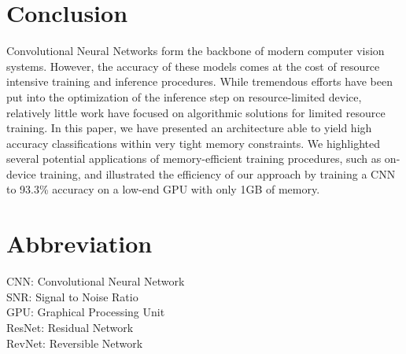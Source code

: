 \documentclass[twocolumn]{bmcart}
\begin{document}
\section{Conclusion}

Convolutional Neural Networks form the backbone of modern computer vision systems.
However, the accuracy of these models comes at the cost of resource intensive training and inference procedures.
While tremendous efforts have been put into the optimization of the inference step on resource-limited device,
relatively little work have focused on algorithmic solutions for limited resource training.
In this paper, we have presented an architecture able to yield high accuracy classifications within very tight memory constraints.
We highlighted several potential applications of memory-efficient training procedures, such as on-device training,
and illustrated the efficiency of our approach by training a CNN to 93.3\% accuracy on a low-end GPU with only 1GB of memory.

\section*{Abbreviation}

CNN: Convolutional Neural Network  \\
SNR: Signal to Noise Ratio \\
GPU: Graphical Processing Unit \\
ResNet: Residual Network \\
RevNet: Reversible Network
\end{document}
